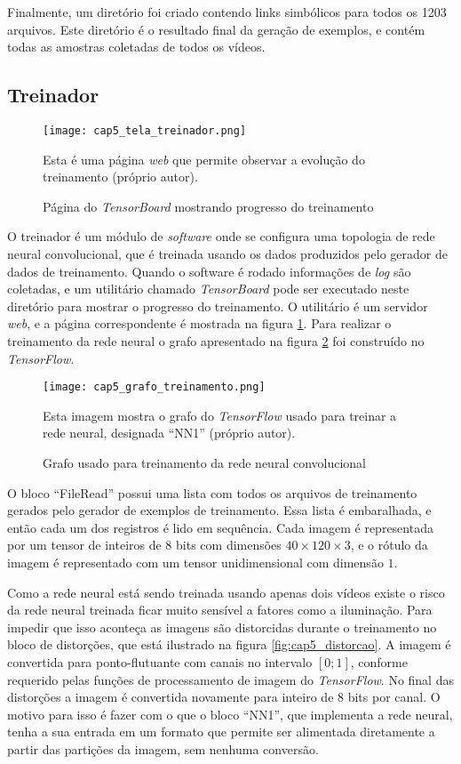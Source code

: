 Finalmente, um diretório foi criado contendo links simbólicos para todos os
1203 arquivos. Este diretório é o resultado final da geração de exemplos,
e contém todas as amostras coletadas de todos os vídeos.

\subsection{Treinador}

\begin{figure}[!htb]
	\centering
	\texttt{[image: cap5\_tela\_treinador.png]}
	\caption{Página do \emph{TensorBoard} mostrando progresso do treinamento}
	\label{fig:cap5_tela_treinador}
	Esta é uma página \emph{web} que permite observar a evolução do
	treinamento (próprio autor).
\end{figure}

O treinador é um módulo de \emph{software} onde se configura uma topologia
de rede neural convolucional, que é treinada usando os dados produzidos pelo
gerador de dados de treinamento. Quando o software é rodado informações de
\emph{log} são coletadas, e um utilitário chamado \emph{TensorBoard} pode ser
executado neste diretório para mostrar o progresso do treinamento. O utilitário
é um servidor \emph{web}, e a página correspondente é mostrada na figura
\ref{fig:cap5_tela_treinador}.
Para realizar o treinamento da rede neural o grafo apresentado na figura
\ref{fig:cap5_grafo_treinamento} foi construído no \emph{TensorFlow}.

\begin{figure}[!htb]
	\centering
	\texttt{[image: cap5\_grafo\_treinamento.png]}
	\caption{Grafo usado para treinamento da rede neural convolucional}
	\label{fig:cap5_grafo_treinamento}
	Esta imagem mostra o grafo do \emph{TensorFlow} usado para treinar
	a rede neural, designada ``NN1'' (próprio autor).
\end{figure}

O bloco ``FileRead'' possui uma lista com todos os arquivos de treinamento
gerados pelo gerador de exemplos de treinamento. Essa lista é embaralhada, e
então cada um dos registros é lido em sequência. Cada imagem é representada por
um tensor de inteiros de 8 bits com dimensões $40 \times 120 \times 3$, e o
rótulo da imagem é representado com um tensor unidimensional com dimensão $1$.

Como a rede neural está sendo treinada usando apenas dois vídeos existe o risco
da rede neural treinada ficar muito sensível a fatores como a iluminação. Para
impedir que isso aconteça as imagens são distorcidas durante o treinamento no
bloco de distorções, que está ilustrado na figura \ref{fig:cap5_distorcao}.
A imagem é convertida para ponto-flutuante com canais no intervalo $[0;1]$,
conforme requerido pelas funções de processamento de imagem do
\emph{TensorFlow}.  No final das distorções a imagem é convertida
novamente para inteiro de 8 bits por canal. O motivo para isso é fazer com o
que o bloco ``NN1'', que implementa a rede neural, tenha a sua entrada em um
formato que permite ser alimentada diretamente a partir das partições da
imagem, sem nenhuma conversão.

